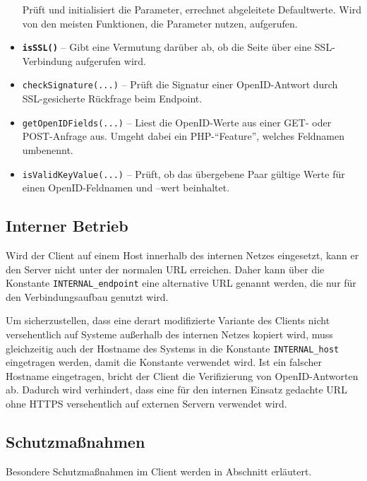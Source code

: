 \begin{itemize}
		Prüft und initialisiert die Parameter, errechnet abgeleitete Defaultwerte.
		Wird von den meisten Funktionen, die Parameter nutzen, aufgerufen.
	\item \textbf{\texttt{isSSL()}} --
		Gibt eine Vermutung darüber ab, ob die Seite über eine SSL-Verbindung aufgerufen wird.
	\item \texttt{checkSignature(...)} --
		Prüft die Signatur einer OpenID-Antwort durch SSL-gesicherte Rückfrage beim Endpoint.
	\item \texttt{getOpenIDFields(...)} -- 
		Liest die OpenID-Werte aus einer GET- oder POST-Anfrage aus. Umgeht dabei ein PHP-"`Feature"', welches Feldnamen umbenennt.
	\item \texttt{isValidKeyValue(...)} -- 
		Prüft, ob das übergebene Paar gültige Werte für einen OpenID-Feldnamen und --wert beinhaltet.
\end{itemize}

\subsection{Interner Betrieb}
Wird der Client auf einem Host innerhalb des internen Netzes eingesetzt, kann er den Server nicht unter der normalen URL erreichen.
Daher kann über die Konstante \texttt{INTERNAL\_endpoint} eine alternative URL genannt werden, die nur für den Verbindungsaufbau genutzt wird.

Um sicherzustellen, dass eine derart modifizierte Variante des Clients nicht versehentlich auf Systeme außerhalb des internen Netzes kopiert wird,
muss gleichzeitig auch der Hostname des Systems in die Konstante \texttt{INTERNAL\_host} eingetragen werden, damit die Konstante verwendet wird.
Ist ein falscher Hostname eingetragen, bricht der Client die Verifizierung von OpenID-Antworten ab.
Dadurch wird verhindert, dass eine für den internen Einsatz gedachte URL ohne HTTPS versehentlich auf externen Servern verwendet wird.

\subsection{Schutzmaßnahmen}
Besondere Schutzmaßnahmen im Client werden in Abschnitt  erläutert.






